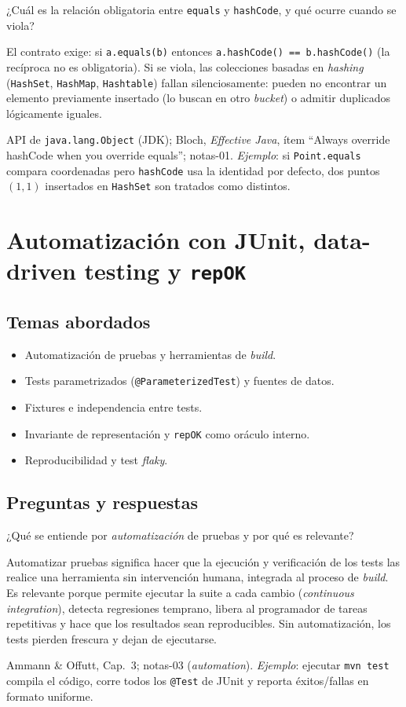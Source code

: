 \documentclass[11pt,a4paper]{article}
\newcounter{preg}
\newcommand{\qa}[3]{%
  \stepcounter{preg}%
  \vspace{0.4em}
  \begin{preguntabox}{\thepreg}
  #1
  \end{preguntabox}
  \begin{respuestabox}
  #2
  \end{respuestabox}
  \begin{refbox}
  #3
  \end{refbox}
  \vspace{0.6em}
}
\begin{document}
\qa{¿Cuál es la relación obligatoria entre \texttt{equals} y \texttt{hashCode}, y qué ocurre cuando se viola?}
{El contrato exige: si \texttt{a.equals(b)} entonces \texttt{a.hashCode() == b.hashCode()} (la recíproca no es obligatoria). Si se viola, las colecciones basadas en \emph{hashing} (\texttt{HashSet}, \texttt{HashMap}, \texttt{Hashtable}) fallan silenciosamente: pueden no encontrar un elemento previamente insertado (lo buscan en otro \emph{bucket}) o admitir duplicados lógicamente iguales.}
{API de \texttt{java.lang.Object} (JDK); Bloch, \emph{Effective Java}, ítem ``Always override hashCode when you override equals''; notas-01. \emph{Ejemplo}: si \texttt{Point.equals} compara coordenadas pero \texttt{hashCode} usa la identidad por defecto, dos puntos $(1,1)$ insertados en \texttt{HashSet} son tratados como distintos.}

\section{Automatización con JUnit, data-driven testing y \texttt{repOK}}

\subsection*{Temas abordados}
\begin{itemize}[leftmargin=1.4em]
  \item Automatización de pruebas y herramientas de \emph{build}.
  \item Tests parametrizados (\texttt{@ParameterizedTest}) y fuentes de datos.
  \item Fixtures e independencia entre tests.
  \item Invariante de representación y \texttt{repOK} como oráculo interno.
  \item Reproducibilidad y test \emph{flaky}.
\end{itemize}

\subsection*{Preguntas y respuestas}

\qa{¿Qué se entiende por \emph{automatización} de pruebas y por qué es relevante?}
{Automatizar pruebas significa hacer que la ejecución y verificación de los tests las realice una herramienta sin intervención humana, integrada al proceso de \emph{build}. Es relevante porque permite ejecutar la suite a cada cambio (\emph{continuous integration}), detecta regresiones temprano, libera al programador de tareas repetitivas y hace que los resultados sean reproducibles. Sin automatización, los tests pierden frescura y dejan de ejecutarse.}
{Ammann \& Offutt, Cap.~3; notas-03 (\emph{automation}). \emph{Ejemplo}: ejecutar \texttt{mvn test} compila el código, corre todos los \texttt{@Test} de JUnit y reporta éxitos/fallas en formato uniforme.}
\end{document}

